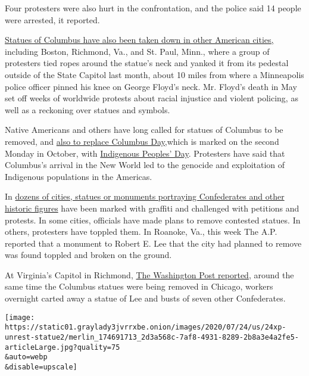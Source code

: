 Four protesters were also hurt in the confrontation, and the police said
14 people were arrested, it reported.

\href{https://www.nytimes3xbfgragh.onion/2020/06/10/us/christopher-columbus-statue-boston-richmond.html}{Statues
of Columbus have also been taken down in other American cities,}
including Boston, Richmond, Va., and St. Paul, Minn., where a group of
protesters tied ropes around the statue's neck and yanked it from its
pedestal outside of the State Capitol last month, about 10 miles from
where a Minneapolis police officer pinned his knee on George Floyd's
neck. Mr. Floyd's death in May set off weeks of worldwide protests about
racial injustice and violent policing, as well as a reckoning over
statues and symbols.

Native Americans and others have long called for statues of Columbus to
be removed, and
\href{https://www.nytimes3xbfgragh.onion/2019/04/28/us/columbus-day-indigenous-peoples.html?searchResultPosition=7}{also
to replace Columbus Day,}which is marked on the second Monday in
October, with
\href{https://www.nytimes3xbfgragh.onion/2019/10/14/nyregion/indigenous-day.html}{Indigenous
Peoples' Day}. Protesters have said that Columbus's arrival in the New
World led to the genocide and exploitation of Indigenous populations in
the Americas.

In
\href{https://www.nytimes3xbfgragh.onion/2020/06/24/us/confederate-statues-photos.html?searchResultPosition=6}{dozens
of cities, statues or monuments portraying Confederates and other
historic figures} have been marked with graffiti and challenged with
petitions and protests. In some cities, officials have made plans to
remove contested statues. In others, protesters have toppled them. In
Roanoke, Va., this week The A.P. reported that a monument to Robert E.
Lee that the city had planned to remove was found toppled and broken on
the ground.

At Virginia's Capitol in Richmond,
\href{https://www.washingtonpost.com/local/virginia-politics/confederate-memorials-quietly-removed-from-virginia-capitol-overnight/2020/07/24/8d2a0dee-cced-11ea-bc6a-6841b28d9093_story.html}{The
Washington Post reported}, around the same time the Columbus statues
were being removed in Chicago, workers overnight carted away a statue of
Lee and busts of seven other Confederates.

\texttt{[image: https://static01.graylady3jvrrxbe.onion/images/2020/07/24/us/24xp-unrest-statue2/merlin\_174691713\_2d3a568c-7af8-4931-8289-2b8a3e4a2fe5-articleLarge.jpg?quality=75\\\&auto=webp\\\&disable=upscale]}

